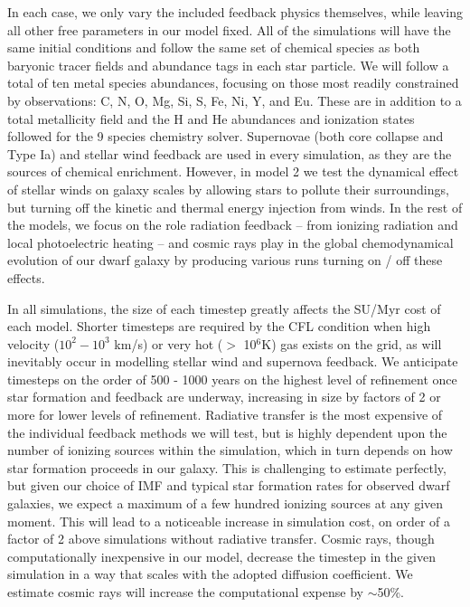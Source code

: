 \documentclass[11pt]{article}
\begin{document}
In each case, we only vary the included feedback physics themselves, while leaving all other free parameters in our model fixed. All of the simulations will have the same initial conditions and follow the same set of chemical species as both baryonic tracer fields and abundance tags in each star particle. We will follow a total of ten metal species abundances, focusing on those most readily constrained by observations: C, N, O, Mg, Si, S, Fe, Ni, Y, and Eu. These are in addition to a total metallicity field and the H and He abundances and ionization states followed for the 9 species chemistry solver. Supernovae (both core collapse and Type Ia) and stellar wind feedback are used in every simulation, as they are the sources of chemical enrichment. However, in model 2 we test the dynamical effect of stellar winds on galaxy scales by allowing stars to pollute their surroundings, but turning off the kinetic and thermal energy injection from winds. In the rest of the models, we focus on the role radiation feedback -- from ionizing radiation and local photoelectric heating -- and cosmic rays play in the global chemodynamical evolution of our dwarf galaxy by producing various runs turning on / off these effects.

In all simulations, the size of each timestep greatly affects the SU/Myr cost of each model. Shorter timesteps are required by the CFL condition when high velocity ($10^{2} - 10^{3}$ km/s) or very hot ($>$ 10$^{6}$K) gas exists on the grid, as will inevitably occur in modelling stellar wind and supernova feedback. We anticipate timesteps on the order of 500 - 1000 years on the highest level of refinement once star formation and feedback are underway, increasing in size by factors of 2 or more for lower levels of refinement. Radiative transfer is the most expensive of the individual feedback methods we will test, but is highly dependent upon the number of ionizing sources within the simulation, which in turn depends on how star formation proceeds in our galaxy. This is challenging to estimate perfectly, but given our choice of IMF and typical star formation rates for observed dwarf galaxies, we expect a maximum of a few hundred ionizing sources at any given moment. This will lead to a noticeable increase in simulation cost, on order of a factor of 2 above simulations without radiative transfer. Cosmic rays, though computationally inexpensive in our model, decrease the timestep in the given simulation in a way that scales with the adopted diffusion coefficient. We estimate cosmic rays will increase the computational expense by $\sim$50\%.
\end{document}
